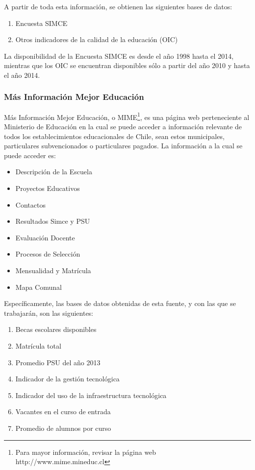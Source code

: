 A partir de toda esta información, se obtienen las siguientes bases de datos:
\begin{enumerate}
\item Encuesta SIMCE
\item Otros indicadores de la calidad de la educación (OIC)
\end{enumerate}

La disponibilidad de la Encuesta SIMCE es desde el año 1998 hasta el 2014, mientras que los OIC se encuentran disponibles sólo a partir del año 2010 y hasta el año 2014. 

\subsubsection{Más Información Mejor Educación}
Más Información Mejor Educación, o MIME\footnote{Para mayor información, revisar la página web http://www.mime.mineduc.cl}, es una página web perteneciente al Ministerio de Educación en la cual se puede acceder a información relevante de todos los establecimientos educacionales de Chile, sean estos municipales, particulares subvencionados o particulares pagados. 
La información a la cual se puede acceder es:
\begin{itemize}
\item Descripción de la Escuela
\item Proyectos Educativos
\item Contactos
\item Resultados Simce y PSU
\item Evaluación Docente
\item Procesos de Selección
\item Mensualidad y Matrícula
\item Mapa Comunal
\end{itemize}

Específicamente, las bases de datos obtenidas de esta fuente, y con las que se trabajarán, son las siguientes: 
\begin{enumerate}
\item Becas escolares disponibles
\item Matrícula total
\item Promedio PSU del año 2013
\item Indicador de la gestión tecnológica
\item Indicador del uso de la infraestructura tecnológica
\item Vacantes en el curso de entrada
\item Promedio de alumnos por curso
\end{enumerate}


